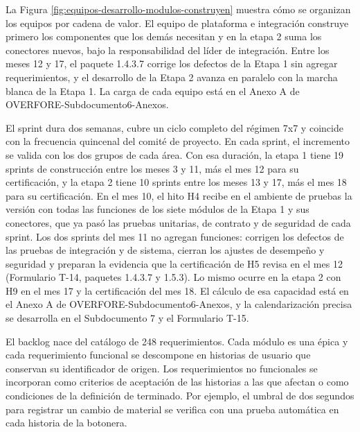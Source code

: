 \documentclass[subdoc]{../../comun/overfore}
\begin{document}
La Figura \ref{fig:equipos-desarrollo-modulos-construyen} muestra cómo se organizan los equipos por cadena de valor. El equipo de plataforma e integración construye primero los componentes que los demás necesitan y en la etapa 2 suma los conectores nuevos, bajo la responsabilidad del líder de integración. Entre los meses 12 y 17, el paquete 1.4.3.7 corrige los defectos de la Etapa 1 sin agregar requerimientos, y el desarrollo de la Etapa 2 avanza en paralelo con la marcha blanca de la Etapa 1. La carga de cada equipo está en el Anexo A de OVERFORE-Subdocumento6-Anexos.

El sprint dura dos semanas, cubre un ciclo completo del régimen 7x7 y coincide con la frecuencia quincenal del comité de proyecto. En cada sprint, el incremento se valida con los dos grupos de cada área. Con esa duración, la etapa 1 tiene 19 sprints de construcción entre los meses 3 y 11, más el mes 12 para su certificación, y la etapa 2 tiene 10 sprints entre los meses 13 y 17, más el mes 18 para su certificación. En el mes 10, el hito H4 recibe en el ambiente de pruebas la versión con todas las funciones de los siete módulos de la Etapa 1 y sus conectores, que ya pasó las pruebas unitarias, de contrato y de seguridad de cada sprint. Los dos sprints del mes 11 no agregan funciones: corrigen los defectos de las pruebas de integración y de sistema, cierran los ajustes de desempeño y seguridad y preparan la evidencia que la certificación de H5 revisa en el mes 12 (Formulario T-14, paquetes 1.4.3.7 y 1.5.3). Lo mismo ocurre en la etapa 2 con H9 en el mes 17 y la certificación del mes 18. El cálculo de esa capacidad está en el Anexo A de OVERFORE-Subdocumento6-Anexos, y la calendarización precisa se desarrolla en el Subdocumento 7 y el Formulario T-15.

El backlog nace del catálogo de 248 requerimientos. Cada módulo es una épica y cada requerimiento funcional se descompone en historias de usuario que conservan su identificador de origen. Los requerimientos no funcionales se incorporan como criterios de aceptación de las historias a las que afectan o como condiciones de la definición de terminado. Por ejemplo, el umbral de dos segundos para registrar un cambio de material se verifica con una prueba automática en cada historia de la botonera.
\end{document}
